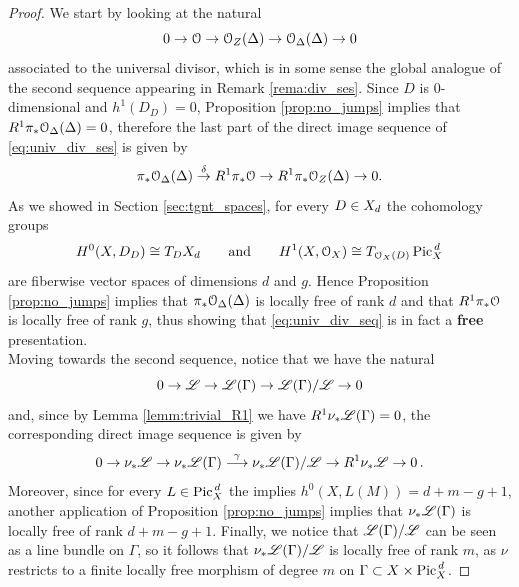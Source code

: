 		\begin{proof}
			We start by looking at the natural \ses
			\begin{equation}\label{eq:univ_div_ses}
				0 \to \mathcal{O} \to \mathcal{O}_Z(\Delta) \to \mathcal{O}_\Delta(\Delta) \to 0 
			\end{equation}
			associated to the universal divisor, which is in some sense the global analogue of the second sequence appearing in Remark \ref{rema:div_ses}. Since $D$ is $0$-dimensional and $h^1(D_D)= 0$, Proposition \ref{prop:no_jumps} implies that $R^1 \pi_* \mathcal{O}_{\Delta}(\Delta) = 0$, therefore the last part of the direct image sequence of \ref{eq:univ_div_ses} is given by
			$$
				\pi_* \mathcal{O}_{\Delta}(\Delta)\overset{\delta}\to R^1 \pi_* \mathcal{O} \to R^1 \pi_* \mathcal{O}_Z(\Delta) \to 0.
			$$
			As we showed in Section \ref{sec:tgnt_spaces}, for every $D\in X_d$ the cohomology groups
			$$ H^0(X, D_D) \cong T_D X_d \qquad \text{and} \qquad H^1(X, \mathcal{O}_X) \cong T_{\mathcal{O}_X(D)} \operatorname{Pic}^{\,d}_X $$
			are fiberwise vector spaces of dimensions $d$ and $g$. Hence Proposition \ref{prop:no_jumps} implies that $\pi_* \mathcal{O}_{\Delta}(\Delta)$ is locally free of rank $d$ and that $R^1 \pi_* \mathcal{O}$ is locally free of rank $g$, thus showing that \eqref{eq:univ_div_seq} is in fact a \textbf{free} presentation.
			\\
			Moving towards the second sequence, notice that we have the natural \ses 
			\begin{equation}\label{eq:univ_lb_ses}
				0 \to \mathscr{L} \to \mathscr{L}(\Gamma) \to \mathscr{L}(\Gamma)/\mathscr{L} \to 0 
			\end{equation}
			and, since by Lemma \ref{lemm:trivial_R1} we have $R^1 \nu_{*} \mathscr{L}(\Gamma) = 0$, the corresponding direct image sequence is given by
			\begin{equation}\label{eq:univ_lb_direct_image}
				0 \to \nu_{*}\mathscr{L} \to \nu_{*} \mathscr{L}(\Gamma)\overset{\gamma}{\longrightarrow} \nu_{*} \mathscr{L}(\Gamma) / \mathscr{L} \to R^1 \nu_{*} \mathscr{L} \to 0 \,.
			\end{equation}
			Moreover, since for every $L\in \operatorname{Pic}^{\,d}_X$ the \RR implies $h^0(X, L(M)) = d+m-g+1 $, another application of Proposition \ref{prop:no_jumps} implies that  $\nu_{*} \mathscr{L}(\Gamma)$ is locally free of rank $d+m-g+1$. 
			Finally, we notice that $\mathscr{L}(\Gamma) / \mathscr{L}$ can be seen as a line bundle on $\Gamma$, so it follows that $\nu_{*} \mathscr{L}(\Gamma) / \mathscr{L}$ is locally free of rank $m$, as $\nu$ restricts to a finite locally free morphism of degree $m$ on $\Gamma\subset X\times \operatorname{Pic}^{\,d}_X$.
		\end{proof}

